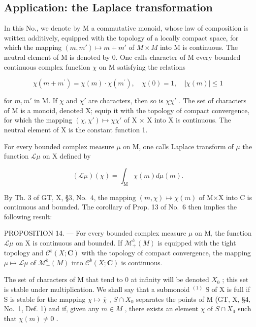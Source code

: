 \subsection{Application: the Laplace transformation}

In this No., we denote by M a commutative monoid, whose law of composition is written additively, equipped with the topology of a locally compact space, for which the mapping \((m, m') \mapsto m + m'\) of \(M \times M\) into M is continuous. The neutral element of M is denoted by 0. One calls character of M every bounded continuous complex function \(\chi\) on M satisfying the relations

\[
\chi (m + m ^ {\prime}) = \chi (m) \cdot \chi (m ^ {\prime}), \quad \chi (0) = 1, \quad | \chi (m) | \leqslant 1\tag{7}
\]

for \(m, m'\) in M. If \(\chi\) and \(\chi'\) are characters, then so is \(\chi\chi'\) . The set of characters of M is a monoid, denoted X; equip it with the topology of compact convergence, for which the mapping \((\chi, \chi') \mapsto \chi\chi'\) of X × X into X is continuous. The neutral element of X is the constant function 1.

For every bounded complex measure \(\mu\) on M, one calls Laplace transform of \(\mu\) the function \(\mathcal{L}\mu\) on X defined by

\[
(\mathscr {L} \mu) (\chi) = \int_ {\mathrm{M}} \chi (m) d \mu (m).\tag{8}
\]

By Th. 3 of GT, X, §3, No.~4, the mapping \((m,\chi)\mapsto\chi(m)\) of M×X into C is continuous and bounded. The corollary of Prop. 13 of No.~6 then implies the following result:

PROPOSITION 14. --- For every bounded complex measure \(\mu\) on M, the function \(\mathcal{L}\mu\) on X is continuous and bounded. If \(\mathcal{M}_{+}^{b}(M)\) is equipped with the tight topology and \(\mathcal{C}^{b}(X; \mathbf{C})\) with the topology of compact convergence, the mapping \(\mu \mapsto \mathcal{L}\mu\) of \(\mathcal{M}_{+}^{b}(M)\) into \(\mathcal{C}^{b}(X; \mathbf{C})\) is continuous.

The set of characters of M that tend to 0 at infinity will be denoted \(X_{0}\) ; this set is stable under multiplication. We shall say that a submonoid \(^{(1)}\) S of X is full if S is stable for the mapping \(\chi\mapsto\overline{\chi}\) , \(S\cap X_{0}\) separates the points of M (GT, X, §4, No.~1, Def. 1) and if, given any \(m\in M\) , there exists an element \(\chi\) of \(S\cap X_{0}\) such that \(\chi(m)\neq0\) .

